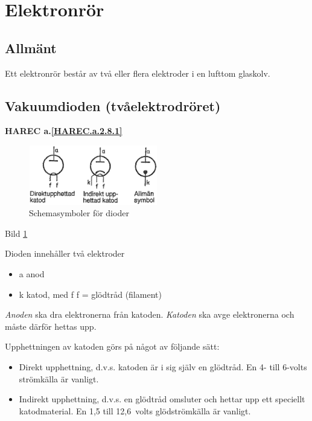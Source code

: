\section{Elektronrör}
\label{elektronrör}

\subsection{Allmänt}

Ett elektronrör består av två eller flera elektroder i en lufttom glaskolv.

\subsection{Vakuumdioden (tvåelektrodröret)}
\textbf{HAREC a.\ref{HAREC.a.2.8.1}\label{myHAREC.a.2.8.1}}
\label{vakuumdioden}

\begin{figure}
\includegraphics[width=0.5\textwidth]{images/cropped_pdfs/bild_2_2-24.pdf}
\caption{Schemasymboler för dioder}
\label{fig:BildII2-24}
\end{figure}

Bild \ref{fig:BildII2-24}

Dioden innehåller två elektroder
\begin{itemize}
\item a anod
\item k katod, med f f = glödtråd (filament)
\end{itemize}

\emph{Anoden} ska dra elektronerna från katoden.
\emph{Katoden} ska avge elektronerna och måste därför hettas upp.

Upphettningen av katoden görs på något av följande sätt:
\begin{itemize}
\item Direkt upphettning, d.v.s. katoden är i sig själv en glödtråd. En 4-
  till 6-volts strömkälla är vanligt.
\item Indirekt upphettning, d.v.s. en glödtråd omsluter och hettar upp ett
  speciellt katodmaterial. En 1,5 till 12,6~volts glödströmkälla är vanligt.
\end{itemize}

